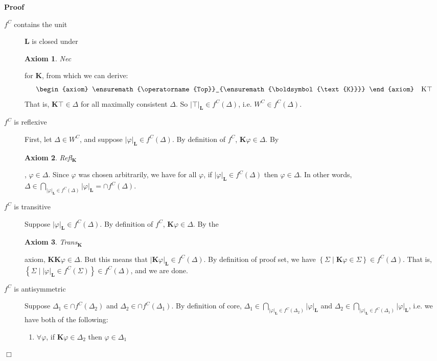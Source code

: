 \documentclass{article}
\newcommand{\tmmathbf}[1]{\ensuremath{\boldsymbol{#1}}}
\newcommand{\tmop}[1]{\ensuremath{\operatorname{#1}}}
\newenvironment{proof}{\noindent\textbf{Proof\ }}{\hspace*{\fill}$\Box$\medskip}
\newtheorem{axiom}{Axiom}
\newcommand{\Logic}{\ensuremath{\tmmathbf{\text{L}}}}
\newcommand{\Know}{\tmmathbf{\text{K}}}
\begin{document}
\begin{proof}
\begin{description}
    \item[$f^C$ contains the unit] $\Logic$ is closed under \begin{axiom}
      Nec
    \end{axiom} for $\Know$, from which we can derive:
    \[ \begin{axiom}
         \tmop{Top}_{\Know}
       \end{axiom} \quad \Know \top \]
    That is, $\Know \top \in \Delta$ for all maximally consistent $\Delta$. So
    $| \top |_{\Logic} \in f^C (\Delta)$, i.e. $W^C \in f^C (\Delta)$.
    
    \item[$f^C$ is reflexive] First, let $\Delta \in W^C$, and suppose $|
    \varphi |_{\Logic} \in f^C (\Delta)$. By definition of $f^C$, $\Know
    \varphi \in \Delta$. By \begin{axiom}
      Refl$_{\Know}$
    \end{axiom}, $\varphi \in \Delta$. Since $\varphi$ was chosen arbitrarily,
    we have for all $\varphi$, if $| \varphi |_{\Logic} \in f^C (\Delta)$ then
    $\varphi \in \Delta$. In other words, $\Delta \in \bigcap_{| \varphi
    |_{\Logic} \in f^C (\Delta)} | \varphi |_{\Logic} = \cap f^C (\Delta)$.
    
    \item[$f^C$ is transitive] Suppose $| \varphi |_{\Logic} \in f^C
    (\Delta)$. By definition of $f^C$, $\Know \varphi \in \Delta$. By the
    \begin{axiom}
      Trans$_{\Know}$
    \end{axiom} axiom, $\Know \Know \varphi \in \Delta$. But this means that
    $\left| \Know \varphi \right|_{\Logic} \in f^C (\Delta)$. By definition of
    proof set, we have $\left\{ \Sigma \mid \Know \varphi \in \Sigma \right\}
    \in f^C (\Delta)$. That is, $\left\{ \Sigma \mid | \varphi |_{\Logic} \in
    f^C (\Sigma) \right\} \in f^C (\Delta)$, and we are done.
    
    \item[$f^C$ is antisymmetric] Suppose $\Delta_1 \in \cap f^C (\Delta_2)$
    and $\Delta_2 \in \cap f^C (\Delta_1)$. By definition of core, $\Delta_1
    \in \bigcap_{| \varphi |_{\Logic} \in f^C (\Delta_2)} | \varphi
    |_{\Logic}$ and $\Delta_2 \in \bigcap_{| \varphi |_{\Logic} \in f^C
    (\Delta_1)} | \varphi |_{\Logic}$, i.e. we have both of the following:
    \begin{enumerate}
      \item $\forall \varphi$, if $\Know \varphi \in \Delta_2$ then $\varphi
      \in \Delta_1$
      

\end{enumerate}
\end{description}
\end{proof}
\end{document}
